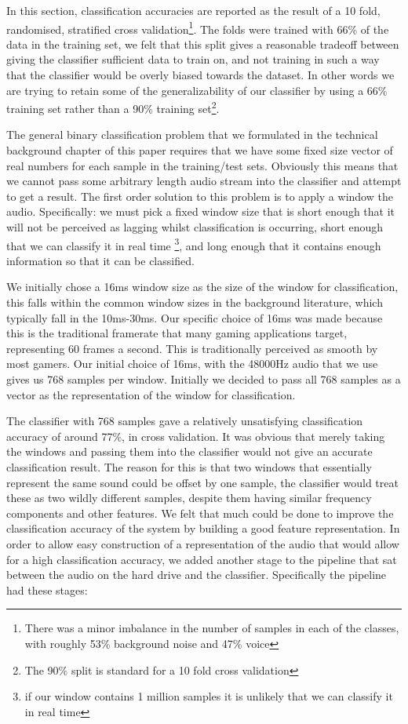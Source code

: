 \documentclass[ %
                    author={Sam Phippen},
                supervisor={Dr. Rafal Bogacz},
                     title={Real time voice activity detectors in noisy personal computing environments},
                  subtitle={},
                    degree={MEng},
                      year={2012} ]{thesis}
\begin{document}
In this section, classification accuracies are reported as the result of a 10
fold, randomised, stratified cross validation\footnote{There was a minor
    imbalance in the number of samples in each of the classes, with roughly
    53\% background noise and 47\% voice}.  The folds were trained with 66\% of
    the data in the training set, we felt that this split gives a reasonable
    tradeoff between giving the classifier sufficient data to train on, and not
    training in such a way that the classifier would be overly biased towards
    the dataset. In other words we are trying to retain some of the
    generalizability of our classifier by using a 66\% training set rather than
    a 90\% training set\footnote{The 90\% split is standard for a 10 fold cross
validation}.

The general binary classification problem that we formulated in the technical
background chapter of this paper requires that we have some fixed size vector
of real numbers for each sample in the training/test sets. Obviously this means
that we cannot pass some arbitrary length audio stream into the classifier and
attempt to get a result. The first order solution to this problem is to apply a
window the audio. Specifically: we must pick a fixed window size that is short
enough that it will not be perceived as lagging whilst classification is
occurring, short enough that we can classify it in real time \footnote{if our
window contains 1 million samples it is unlikely that we can classify it in
real time}, and long enough that it contains enough information so that it can
be classified.

We initially chose a 16ms window size as the size of the window for
classification, this falls within the common window sizes in the background
literature, which typically fall in the 10ms-30ms. Our specific choice of 16ms
was made because this is the traditional framerate that many gaming
applications target, representing 60 frames a second. This is traditionally
perceived as smooth by most gamers. Our initial choice of 16ms, with the 48000Hz
audio that we use gives us 768 samples per window. Initially we decided to pass
all 768 samples as a vector as the representation of the window for
classification.

The classifier with 768 samples gave a relatively unsatisfying classification
accuracy of around 77\%, in cross validation. It was obvious that merely taking
the windows and passing them into the classifier would not give an accurate
classification result. The reason for this is that two windows that essentially
represent the same sound could be offset by one sample, the classifier would
treat these as two wildly different samples, despite them having similar
frequency components and other features. We felt that much could be done to
improve the classification accuracy of the system by building a good feature
representation. In order to allow easy construction of a representation of the
audio that would allow for a high classification accuracy, we added another
stage to the pipeline that sat between the audio on the hard drive and the
classifier. Specifically the pipeline had these stages:
\end{document}
